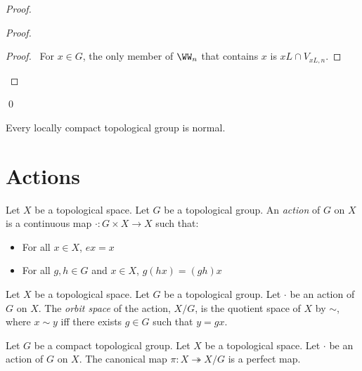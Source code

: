 \begin{proof}
    \begin{proof}
        \begin{proof}
            \pf\ For $x \in G$, the only member of $\WW_n$ that contains $x$ is $xL \cap V_{xL,n}$.
        \end{proof}
    \end{proof}
    \qed
\end{proof}

\begin{corollary}
    Every locally compact topological group is normal.
\end{corollary}
\section{Actions}

\begin{definition}[Action]
    Let $X$ be a topological space. Let $G$ be a topological group.
    An \emph{action} of $G$ on $X$ is a continuous map $\cdot : G \times X \rightarrow X$
    such that:
    \begin{itemize}
        \item For all $x \in X$, $ex = x$
        \item For all $g, h \in G$ and $x \in X$, $g(hx) = (gh)x$
    \end{itemize}
\end{definition}

\begin{definition}
    Let $X$ be a topological space. Let $G$ be a topological group.
    Let $\cdot$ be an action of $G$ on $X$. The \emph{orbit space}
    of the action, $X / G$, is the quotient space of $X$ by $\sim$,
    where $x \sim y$ iff there exists $g \in G$ such that $y = gx$.
\end{definition}

\begin{proposition}
    Let $G$ be a compact topological group. Let $X$ be a topological space.
    Let $\cdot$ be an action of $G$ on $X$. The canonical map $\pi : X \twoheadrightarrow X / G$
    is a perfect map.
\end{proposition}

